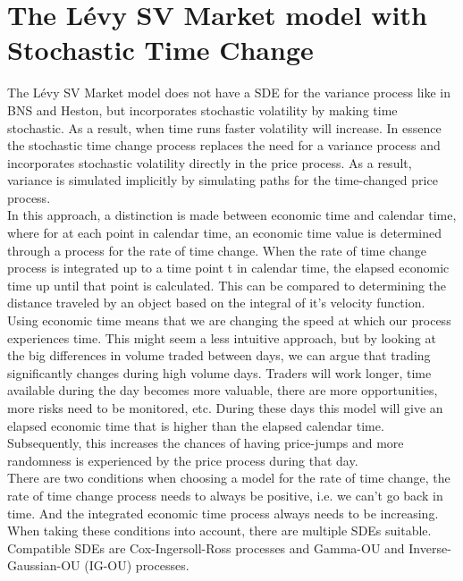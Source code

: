 \section{The Lévy SV Market model with Stochastic Time Change}

The Lévy SV Market model does not have a SDE for the variance process like in BNS and Heston, but incorporates stochastic volatility by making time stochastic. As a result, when time runs faster volatility will increase.
In essence the stochastic time change process replaces the need for a variance process and incorporates stochastic volatility directly in the price process. As a result, variance is simulated implicitly by simulating paths for the time-changed price process.\\

In this approach, a distinction is made between economic time and calendar time, where for at each point in calendar time, an economic time value is determined through a process for the rate of time change. When the rate of time change process is integrated up to a time point t in calendar time, the elapsed economic time up until that point is calculated. This can be compared to determining the distance traveled by an object based on the integral of it's velocity function.\\

Using economic time means that we are changing the speed at which our process experiences time. This might seem a less intuitive approach, but by looking at the big differences in volume traded between days, we can argue that trading significantly changes during high volume days. Traders will work longer, time available during the day becomes more valuable, there are more opportunities, more risks need to be monitored, etc. During these days this model will give an elapsed economic time that is higher than the elapsed calendar time. Subsequently, this increases the chances of having price-jumps and more randomness is experienced by the price process during that day.\\

There are two conditions when choosing a model for the rate of time change, the rate of time change process needs to always be positive, i.e. we can't go back in time. And the integrated economic time process always needs to be increasing. When taking these conditions into account, there are multiple SDEs suitable. Compatible SDEs are Cox-Ingersoll-Ross processes and Gamma-OU and Inverse-Gaussian-OU (IG-OU) processes.\\

